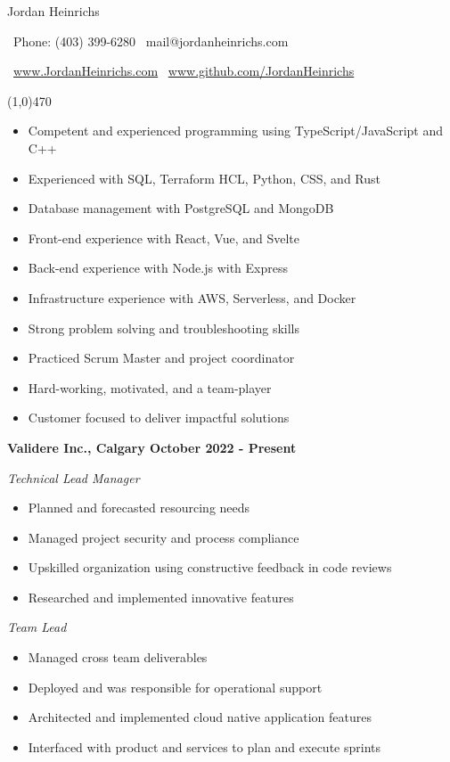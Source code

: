 \documentclass[12pt]{article}
\begin{document}
\centerline{{\Huge \sc Jordan Heinrichs}}
\medskip
\centerline{\textbullet\ Phone: (403) 399-6280 \hspace{5pt} \textbullet\ mail@jordanheinrichs.com}
\centerline{\textbullet\ \url{www.JordanHeinrichs.com}  \hspace{5pt} \textbullet\ \url{www.github.com/JordanHeinrichs}}
\noindent
\line(1,0){470}\\

\bigskip
{}
\medskip

\begin{itemize}
\item Competent and experienced programming using TypeScript/JavaScript and C++
\item Experienced with SQL, Terraform HCL, Python, CSS, and Rust
\item Database management with PostgreSQL and MongoDB
\item Front-end experience with React, Vue, and Svelte
\item Back-end experience with Node.js with Express
\item Infrastructure experience with AWS, Serverless, and Docker
\item Strong problem solving and troubleshooting skills
\item Practiced Scrum Master and project coordinator
\item Hard-working, motivated, and a team-player
\item Customer focused to deliver impactful solutions
\end{itemize}
\noindent

\bigskip
{}
\bigskip

\noindent \centerline{ \bf Validere Inc., Calgary \hfill October 2022 - Present}
\indent \emph{ Technical Lead Manager }
\begin{itemize}
  \item Planned and forecasted resourcing needs
  \item Managed project security and process compliance
  \item Upskilled organization using constructive feedback in code reviews
  \item Researched and implemented innovative features
\end{itemize}

\indent \emph{ Team Lead }
\begin{itemize}
  \item Managed cross team deliverables
  \item Deployed and was responsible for operational support
  \item Architected and implemented cloud native application features
  \item Interfaced with product and services to plan and execute sprints
\end{itemize}
\end{document}

